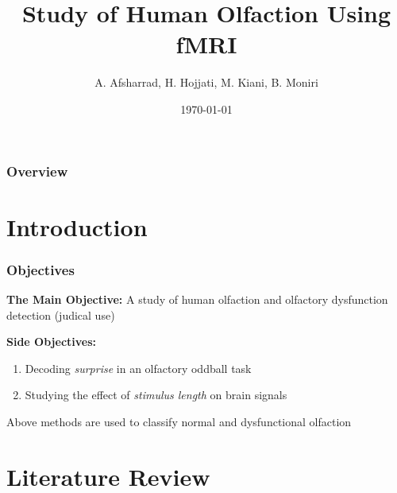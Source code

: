 \documentclass{beamer}
\title[Hmuan Olfaction]{Study of Human Olfaction Using fMRI} %
\author{A. Afsharrad, H. Hojjati, M. Kiani, B. Moniri} %
\institute[Sharif University of Technology] %
{
Ambient Intelligence Research Lab (AIR Lab)\\ \textbf{Sharif University of Technology} \\ 
\medskip
}
\date{\today} %
\begin{document}
\begin{frame}
\titlepage %
\end{frame}

\begin{frame}
\frametitle{Overview} %
\tableofcontents %
\end{frame}


\section{Introduction} 

\begin{frame}
\frametitle{Objectives}
\textbf{The Main Objective:}
A study of human olfaction and olfactory dysfunction detection (judical use)
\\
\vspace{0.5cm}

\textbf{Side Objectives:}
\begin{enumerate}
	\item
	Decoding \emph{surprise} in an olfactory oddball task
	\item
	Studying the effect of \emph{stimulus length} on brain signals
\end{enumerate}
Above methods are used to classify normal and dysfunctional olfaction
\end{frame}


\section{Literature Review} 
\end{document}
